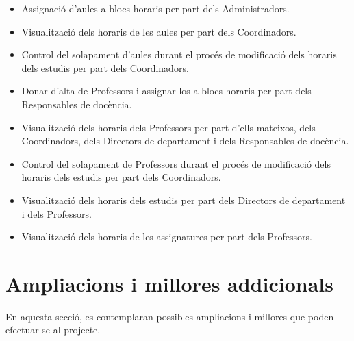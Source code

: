 \documentclass[a4paper,12pt]{ThesisStyle}
\begin{document}
\begin{itemize}
  \item Assignació d'aules a blocs horaris per part dels Administradors.
  \item Visualització dels horaris de les aules per part dels Coordinadors.
  \item Control del solapament d'aules durant el procés de modificació dels horaris dels estudis per part dels Coordinadors.
  \item Donar d'alta de Professors i assignar-los a blocs horaris per part dels Responsables de docència.
  \item Visualització dels horaris dels Professors per part d'ells mateixos, dels Coordinadors, dels Directors de departament i dels Responsables de docència.
  \item Control del solapament de Professors durant el procés de modificació dels horaris dels estudis per part dels Coordinadors.
  \item Visualització dels horaris dels estudis per part dels Directors de departament i dels Professors.
  \item Visualització dels horaris de les assignatures per part dels Professors.
\end{itemize}

\section{Ampliacions i millores addicionals}
\label{sec:ampliacions}

En aquesta secció, es contemplaran possibles ampliacions i millores que poden efectuar-se al projecte.
\end{document}

